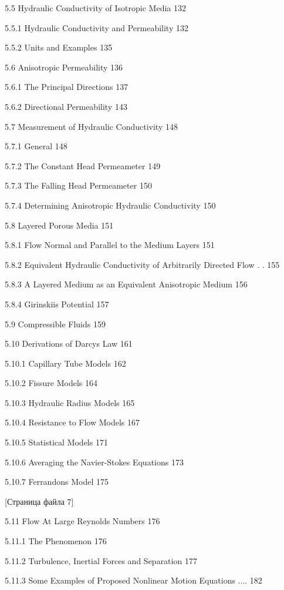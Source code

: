 \documentclass[
  11pt,
]{article}
\begin{document}
5.5 Hydraulic Conductivity of Isotropic Media 132 \par
5.5.1 Hydraulic Conductivity and Permeability 132 \par
5.5.2 Units and Examples 135 \par
5.6 Anisotropic Permeability 136 \par
5.6.1 The Principal Directions 137 \par
5.6.2 Directional Permeability 143 \par
5.7 Measurement of Hydraulic Conductivity 148 \par
5.7.1 General 148 \par
5.7.2 The Constant Head Permeameter 149 \par
5.7.3 The Falling Head Permeameter 150 \par
5.7.4 Determining Anisotropic Hydraulic Conductivity 150 \par
5.8 Layered Porous Media 151 \par
5.8.1 Flow Normal and Parallel to the Medium Layers 151 \par
5.8.2 Equivalent Hydraulic Conductivity of Arbitrarily Directed Flow . . 155 \par
5.8.3 A Layered Medium as an Equivalent Anisotropic Medium 156 \par
5.8.4 Girinskii\textquotesingle s Potential 157 \par
5.9 Compressible Fluids 159 \par
5.10 Derivations of Darcy\textquotesingle s Law 161 \par
5.10.1 Capillary Tube Models 162 \par
5.10.2 Fissure Models 164 \par
5.10.3 Hydraulic Radius Models 165 \par
5.10.4 Resistance to Flow Models 167 \par
5.10.5 Statistical Models 171 \par
5.10.6 Averaging the Navier-Stokes Equations 173 \par
5.10.7 Ferrandon\textquotesingle s Model 175 \par
\smallskip
\smallskip
\smallskip
{[}Страница файла 7{]}\par
5.11 Flow At Large Reynolds Numbers 176 \par
5.11.1 The Phenomenon 176 \par
5.11.2 Turbulence, Inertial Forces and Separation 177 \par
5.11.3 Some Examples of Proposed Nonlinear Motion Equations .... 182 \par
\end{document}

